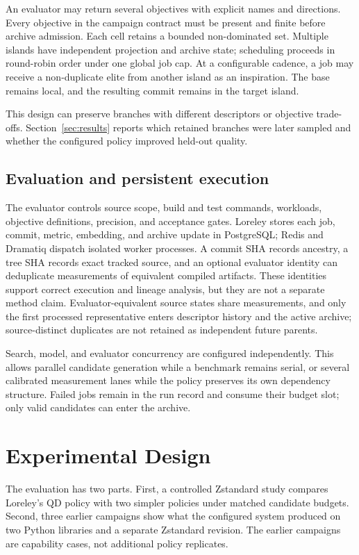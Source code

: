 \documentclass[10pt,twocolumn]{article}
\begin{document}
An evaluator may return several objectives with explicit names and directions.
Every objective in the campaign contract must be present and finite before
archive admission. Each cell retains a bounded non-dominated set. Multiple
islands have independent projection and archive state; scheduling proceeds in
round-robin order under one global job cap. At a configurable cadence, a job
may receive a non-duplicate elite from another island as an inspiration. The
base remains local, and the resulting commit remains in the target island.

This design can preserve branches with different descriptors or objective
trade-offs. Section~\ref{sec:results} reports which retained branches were
later sampled and whether the configured policy improved held-out quality.

\subsection{Evaluation and persistent execution}

The evaluator controls source scope, build and test commands, workloads,
objective definitions, precision, and acceptance gates. Loreley stores each
job, commit, metric, embedding, and archive update in PostgreSQL; Redis and
Dramatiq dispatch isolated worker processes. A commit SHA records ancestry, a
tree SHA records exact tracked source, and an optional evaluator identity can
deduplicate measurements of equivalent compiled artifacts. These identities
support correct execution and lineage analysis, but they are not a separate
method claim. Evaluator-equivalent source states share measurements, and only
the first processed representative enters descriptor history and the active
archive; source-distinct duplicates are not retained as independent future
parents.

Search, model, and evaluator concurrency are configured independently. This
allows parallel candidate generation while a benchmark remains serial, or
several calibrated measurement lanes while the policy preserves its own
dependency structure. Failed jobs remain in the run record and consume their
budget slot; only valid candidates can enter the archive.

\section{Experimental Design}
\label{sec:experiments}

The evaluation has two parts. First, a controlled Zstandard study compares
Loreley's QD policy with two simpler policies under matched candidate budgets.
Second, three earlier campaigns show what the configured system produced on two
Python libraries and a separate Zstandard revision. The earlier campaigns are
capability cases, not additional policy replicates.
\end{document}
